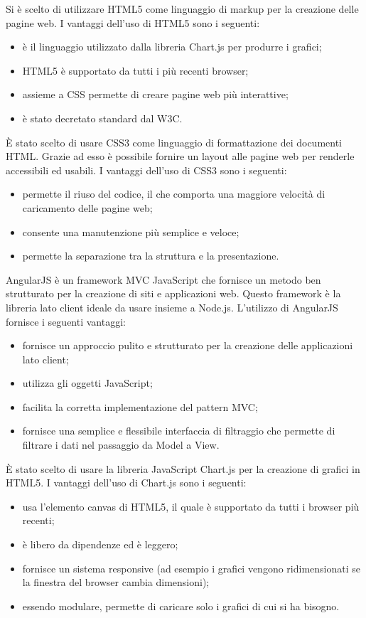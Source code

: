 Si è scelto di utilizzare HTML5 come linguaggio di markup per la creazione delle pagine web.
I vantaggi dell'uso di HTML5 sono i seguenti:
\begin{itemize}
\item è il linguaggio utilizzato dalla libreria Chart.js per produrre i grafici;
\item HTML5 è supportato da tutti i più recenti browser;
\item assieme a CSS permette di creare pagine web più interattive;
\item è stato decretato standard dal W3C.
\end{itemize}

È stato scelto di usare CSS3 come linguaggio di formattazione dei documenti HTML. Grazie ad esso è possibile fornire un layout alle pagine web per renderle accessibili ed usabili.
I vantaggi dell'uso di CSS3 sono i seguenti:
\begin{itemize}
\item permette il riuso del codice, il che comporta una maggiore velocità di caricamento delle pagine web;
\item consente una manutenzione più semplice e veloce;
\item permette la separazione tra la struttura e la presentazione.
\end{itemize}

AngularJS è un framework MVC JavaScript che fornisce un metodo ben strutturato per la creazione di siti e applicazioni web. Questo framework è la libreria lato client ideale da usare insieme a Node.js.
L'utilizzo di AngularJS fornisce i seguenti vantaggi:
\begin{itemize}
\item fornisce un approccio pulito e strutturato per la creazione delle applicazioni lato client;
\item utilizza gli oggetti JavaScript;
\item facilita la corretta implementazione del pattern MVC;
\item fornisce una semplice e flessibile interfaccia di filtraggio che permette di filtrare i dati nel passaggio da Model a View.
\end{itemize}

È stato scelto di usare la libreria JavaScript Chart.js per la creazione di grafici in HTML5.
I vantaggi dell'uso di Chart.js sono i seguenti:
\begin{itemize}
\item usa l'elemento canvas di HTML5, il quale è supportato da tutti i browser più recenti;
\item è libero da dipendenze ed è leggero;
\item fornisce un sistema responsive (ad esempio i grafici vengono ridimensionati se la finestra del browser cambia dimensioni);
\item essendo modulare, permette di caricare solo i grafici di cui si ha bisogno.
\end{itemize}


